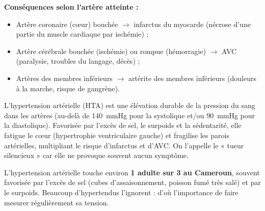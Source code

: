 \documentclass[11pt]{article}
\newcommand{\cle}[1]{{\popxbold\color{popdark}#1}}
\begin{document}
\textbf{Conséquences selon l'artère atteinte :}
\begin{itemize}
\item Artère coronaire (cœur) bouchée $\rightarrow$ \cle{infarctus du myocarde} (nécrose d'une partie du muscle cardiaque par ischémie) ;
\item Artère cérébrale bouchée (ischémie) ou rompue (hémorragie) $\rightarrow$ \cle{AVC} (paralysie, troubles du langage, décès) ;
\item Artères des membres inférieurs $\rightarrow$ artérite des membres inférieurs (douleurs à la marche, risque de gangrène).
\end{itemize}

\begin{definition}
L'\cle{hypertension artérielle} (HTA) est une élévation durable de la pression du sang dans les artères (au-delà de \SI{140}{\mmHg} pour la systolique et/ou \SI{90}{\mmHg} pour la diastolique). Favorisée par l'excès de sel, le surpoids et la sédentarité, elle fatigue le cœur (hypertrophie ventriculaire gauche) et fragilise les parois artérielles, multipliant le risque d'infarctus et d'AVC. On l'appelle le « tueur silencieux » car elle ne provoque souvent aucun symptôme.
\end{definition}

\begin{exemplebox}
L'hypertension artérielle touche environ \textbf{1 adulte sur 3 au Cameroun}, souvent favorisée par l'excès de sel (cubes d'assaisonnement, poisson fumé très salé) et par le surpoids. Beaucoup d'hypertendus l'ignorent : d'où l'importance de faire mesurer régulièrement sa tension.
\end{exemplebox}
\end{document}
